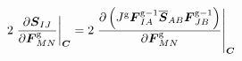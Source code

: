 \documentclass[10pt,letterpaper,oneside]{report}
\newcommand{\ten}[1]{\mbox{\boldmath $#1$}{}}
\newcommand{\tenf}[1]{\mbox{{\sffamily{\bfseries {#1}}}}}
\newcommand{\scas}[1]{\mbox{{\scriptsize{${\rm{#1}}$}}}{}}
\newcommand{\tens}[1]{\mbox{\boldmath{\scriptsize{$#1$}}}{}}
\begin{document}
\begin{align}
2 \left. \frac{\partial \ten{S}_{IJ}}{\partial \ten{F}^{\scas{g}}_{MN}} \right|_{\tens{C}} 
={}& 2 \left. \frac{\partial \left( J^{\scas{g}} \ten{F}^{\scas{g}-1}_{IA} \overline{\ten{S}}_{AB} \ten{F}^{\scas{g}-1}_{JB} \right) }{\partial \ten{F}^{\scas{g}}_{MN}} \right|_{\tens{C}} 
\\

\end{align}
\end{document}

